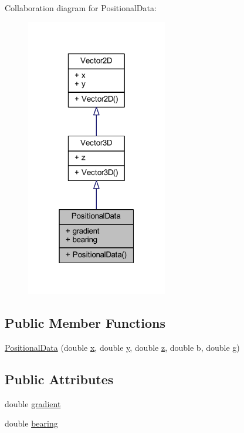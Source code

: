 Collaboration diagram for Positional\+Data\+:
\nopagebreak
\begin{figure}[H]
\begin{center}
\leavevmode
\includegraphics[width=175pt]{class_positional_data__coll__graph}
\end{center}
\end{figure}
\subsection*{Public Member Functions}
\begin{DoxyCompactItemize}
\item 
\hyperlink{class_positional_data_a31b77f08d0a18c72e3b21cac6bc2d095}{Positional\+Data} (double \hyperlink{class_vector2_d_ac5c4e553815737aa24bec8281270178f}{x}, double \hyperlink{class_vector2_d_ac38d0179cfe74c30fee290a703ab209a}{y}, double \hyperlink{class_vector3_d_a7321f3ff785f275c4d83f7d1b951752a}{z}, double b, double g)
\end{DoxyCompactItemize}
\subsection*{Public Attributes}
\begin{DoxyCompactItemize}
\item 
double \hyperlink{class_positional_data_a2aa73f7333432a8b32d2036f4c940ff3}{gradient}
\item 
double \hyperlink{class_positional_data_a2ae5a622a025a392acfb29c66e6c310e}{bearing}
\end{DoxyCompactItemize}


